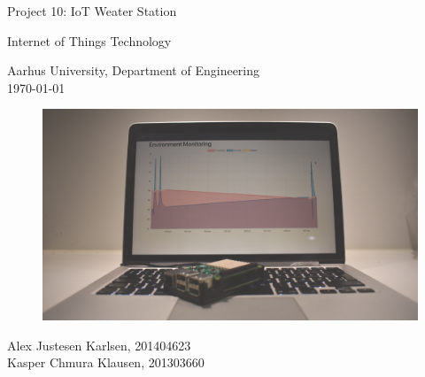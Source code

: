 \begin{titlepage}
    \begin{center}
        {\huge Project 10: IoT Weater Station} \\ \vspace{10px}

        {\huge Internet of Things Technology} \\ \vspace{10px}

        {Aarhus University, Department of Engineering} \\ 
        {\today} \\ \vspace{10px}
        \begin{figure} [H]
            \includegraphics[width=\textwidth]{figures/Picture1.png}
        \end{figure}
        {Alex Justesen Karlsen, 201404623} \\
        {Kasper Chmura Klausen, 201303660} \\ \vspace{10px}
    \end{center}
\end{titlepage}